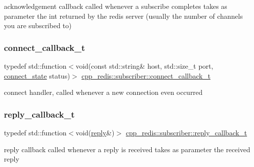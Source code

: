 acknowledgement callback called whenever a subscribe completes takes as parameter the int returned by the redis server (usually the number of channels you are subscribed to) \mbox{\label{classcpp__redis_1_1subscriber_a90f2f7d4c748c3c2e89d1e977fa6dce1}} 
\subsubsection{\texorpdfstring{connect\+\_\+callback\+\_\+t}{connect\_callback\_t}}
{\footnotesize\ttfamily typedef std\+::function$<$void(const std\+::string\& host, std\+::size\+\_\+t port, \hyperlink{classcpp__redis_1_1subscriber_afc976757efd9d0ac4def6935546a2338}{connect\+\_\+state} status)$>$ \hyperlink{classcpp__redis_1_1subscriber_a90f2f7d4c748c3c2e89d1e977fa6dce1}{cpp\+\_\+redis\+::subscriber\+::connect\+\_\+callback\+\_\+t}}

connect handler, called whenever a new connection even occurred \mbox{\label{classcpp__redis_1_1subscriber_a99d220cc662664e2399b709f61ac9581}} 
\subsubsection{\texorpdfstring{reply\+\_\+callback\+\_\+t}{reply\_callback\_t}}
{\footnotesize\ttfamily typedef std\+::function$<$void(\hyperlink{classcpp__redis_1_1reply}{reply}\&)$>$ \hyperlink{classcpp__redis_1_1subscriber_a99d220cc662664e2399b709f61ac9581}{cpp\+\_\+redis\+::subscriber\+::reply\+\_\+callback\+\_\+t}}

reply callback called whenever a reply is received takes as parameter the received reply \mbox{\label{classcpp__redis_1_1subscriber_ac6ab8ebc526d784e4b79a39bbd73dca8}} 
